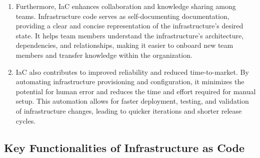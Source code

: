 \begin{enumerate}
    \item Furthermore, IaC enhances collaboration and knowledge sharing among teams. Infrastructure code serves as self-documenting documentation, providing a clear and concise representation of the infrastructure's desired state. It helps team members understand the infrastructure's architecture, dependencies, and relationships, making it easier to onboard new team members and transfer knowledge within the organization.

    \item IaC also contributes to improved reliability and reduced time-to-market. By automating infrastructure provisioning and configuration, it minimizes the potential for human error and reduces the time and effort required for manual setup. This automation allows for faster deployment, testing, and validation of infrastructure changes, leading to quicker iterations and shorter release cycles.

\end{enumerate}

\subsection*{Key Functionalities of Infrastructure as Code}

